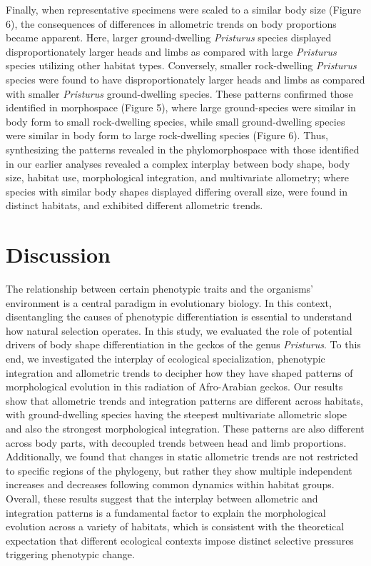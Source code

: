 \documentclass[
  11pt,
]{article}
\begin{document}
Finally, when representative specimens were scaled to a similar body
size (Figure 6), the consequences of differences in allometric trends on
body proportions became apparent. Here, larger ground-dwelling
\emph{Pristurus} species displayed disproportionately larger heads and
limbs as compared with large \emph{Pristurus} species utilizing other
habitat types. Conversely, smaller rock-dwelling \emph{Pristurus}
species were found to have disproportionately larger heads and limbs as
compared with smaller \emph{Pristurus} ground-dwelling species. These
patterns confirmed those identified in morphospace (Figure 5), where
large ground-species were similar in body form to small rock-dwelling
species, while small ground-dwelling species were similar in body form
to large rock-dwelling species (Figure 6). Thus, synthesizing the
patterns revealed in the phylomorphospace with those identified in our
earlier analyses revealed a complex interplay between body shape, body
size, habitat use, morphological integration, and multivariate
allometry; where species with similar body shapes displayed differing
overall size, were found in distinct habitats, and exhibited different
allometric trends. \hfill\break

\hypertarget{discussion}{%
\section{Discussion}\label{discussion}}

The relationship between certain phenotypic traits and the organisms'
environment is a central paradigm in evolutionary biology. In this
context, disentangling the causes of phenotypic differentiation is
essential to understand how natural selection operates. In this study,
we evaluated the role of potential drivers of body shape differentiation
in the geckos of the genus \emph{Pristurus}. To this end, we
investigated the interplay of ecological specialization, phenotypic
integration and allometric trends to decipher how they have shaped
patterns of morphological evolution in this radiation of Afro-Arabian
geckos. Our results show that allometric trends and integration patterns
are different across habitats, with ground-dwelling species having the
steepest multivariate allometric slope and also the strongest
morphological integration. These patterns are also different across body
parts, with decoupled trends between head and limb proportions.
Additionally, we found that changes in static allometric trends are not
restricted to specific regions of the phylogeny, but rather they show
multiple independent increases and decreases following common dynamics
within habitat groups. Overall, these results suggest that the interplay
between allometric and integration patterns is a fundamental factor to
explain the morphological evolution across a variety of habitats, which
is consistent with the theoretical expectation that different ecological
contexts impose distinct selective pressures triggering phenotypic
change. \hfill\break
\end{document}
